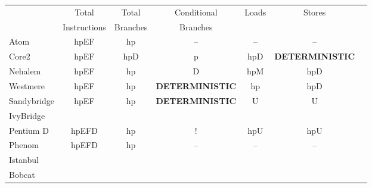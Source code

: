 \begin{tabular}{|l||c|c|c|c|c|c|}

\hline
            	&
Total		&
Total		&
Conditional	&
\multirow{2}{*}{Loads}			&
\multirow{2}{*}{Stores}			\\


	&
Instructions	&
Branches	&
Branches	&
	&
	\\


\hline
\hline


Atom	& 
hpEF	& %
hp	& %
--	& %
--	& %
--	\\ %
\hline

Core2	&
hpEF	& %
hpD	& %
p	& %
hpD	& %
{\scriptsize \bf DETERMINISTIC}	\\ %
\hline

Nehalem &
hpEF	& %
hp	& %
D	& %
hpM	& %
hpD	\\ %
\hline

Westmere	&
hpEF	& %
hp	& %
{\scriptsize \bf DETERMINISTIC}	& %
hp	& %
hpD	\\ %
\hline

Sandybridge		&
\multirow{2}{*}{hpEF}	& %
\multirow{2}{*}{hp}	& %
\multirow{2}{*}{\scriptsize \bf DETERMINISTIC}	& %
\multirow{2}{*}{U}	& %
\multirow{2}{*}{U}	\\ %

IvyBridge		&
			& %
			& %
			& %
			& %
			\\ %
\hline

Pentium D	&
hpEFD		& %
hp		& %
!		& %
hpU		& %
hpU		\\ %
\hline

Phenom		&
\multirow{3}{*}{hpEFD}	& %
\multirow{3}{*}{hp}	& %
\multirow{3}{*}{--}	& %
\multirow{3}{*}{--} 	& %
\multirow{3}{*}{--}	\\ %

Istanbul		&
			& %
			& %
			& %
			& %
			\\ %

Bobcat			&
			& %
			& %
			& %
			& %
			\\ %
\hline

\end{tabular}


